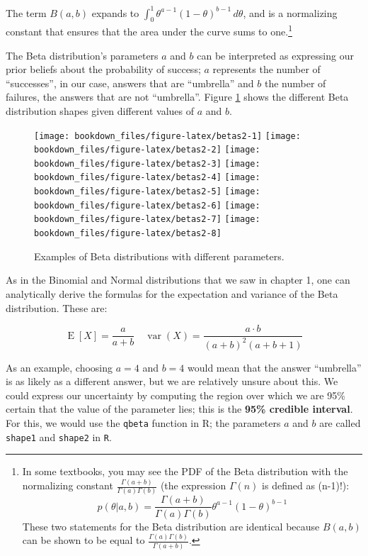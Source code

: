 \documentclass[12pt,]{krantz}
\theoremstyle{definition}
\theoremstyle{definition}
\theoremstyle{definition}
\theoremstyle{remark}
\begin{document}
The term \(B(a,b)\) expands to
\(\int_0^1 \theta^{a-1}(1-\theta)^{b-1}\, d\theta\), and is a
normalizing constant that ensures that the area under the curve sums to
one.\footnote{In some textbooks, you may see the PDF of the Beta
  distribution with the normalizing constant
  \(\frac{\Gamma(a+b)}{\Gamma(a)\Gamma(b)}\) (the expression
  \(\Gamma(n)\) is defined as (n-1)!):
  \[p(\theta|a,b)=  \frac{\Gamma(a+b)}{\Gamma(a)\Gamma(b)} \theta^{a - 1} (1-\theta)^{b-1}\]
  These two statements for the Beta distribution are identical because
  \(B(a,b)\) can be shown to be equal to
  \(\frac{\Gamma(a)\Gamma(b)}{\Gamma(a+b)}\).}

The Beta distribution's parameters \(a\) and \(b\) can be interpreted as
expressing our prior beliefs about the probability of success; \(a\)
represents the number of ``successes'', in our case, answers that are
``umbrella'' and \(b\) the number of failures, the answers that are not
``umbrella''. Figure \ref{fig:betas2} shows the different Beta
distribution shapes given different values of \(a\) and \(b\).

\begin{figure}
\texttt{[image: bookdown\_files/figure-latex/betas2-1]} \texttt{[image: bookdown\_files/figure-latex/betas2-2]} \texttt{[image: bookdown\_files/figure-latex/betas2-3]} \texttt{[image: bookdown\_files/figure-latex/betas2-4]} \texttt{[image: bookdown\_files/figure-latex/betas2-5]} \texttt{[image: bookdown\_files/figure-latex/betas2-6]} \texttt{[image: bookdown\_files/figure-latex/betas2-7]} \texttt{[image: bookdown\_files/figure-latex/betas2-8]} \caption{Examples of Beta distributions with different parameters.}\label{fig:betas2}
\end{figure}

As in the Binomial and Normal distributions that we saw in chapter 1,
one can analytically derive the formulas for the expectation and
variance of the Beta distribution. These are:

\begin{equation}
\operatorname{E}[X] = \frac{a}{a+b} \quad \operatorname{var}(X)=\frac {a \cdot b }{(a + b )^{2}(a + b +1)}
\label{eq:meanvar}
\end{equation}

As an example, choosing \(a=4\) and \(b=4\) would mean that the answer
``umbrella'' is as likely as a different answer, but we are relatively
unsure about this. We could express our uncertainty by computing the
region over which we are 95\% certain that the value of the parameter
lies; this is the \textbf{95\% credible interval}. For this, we would
use the \texttt{qbeta} function in R; the parameters \(a\) and \(b\) are
called \texttt{shape1} and \texttt{shape2} in \texttt{R}.
\end{document}
